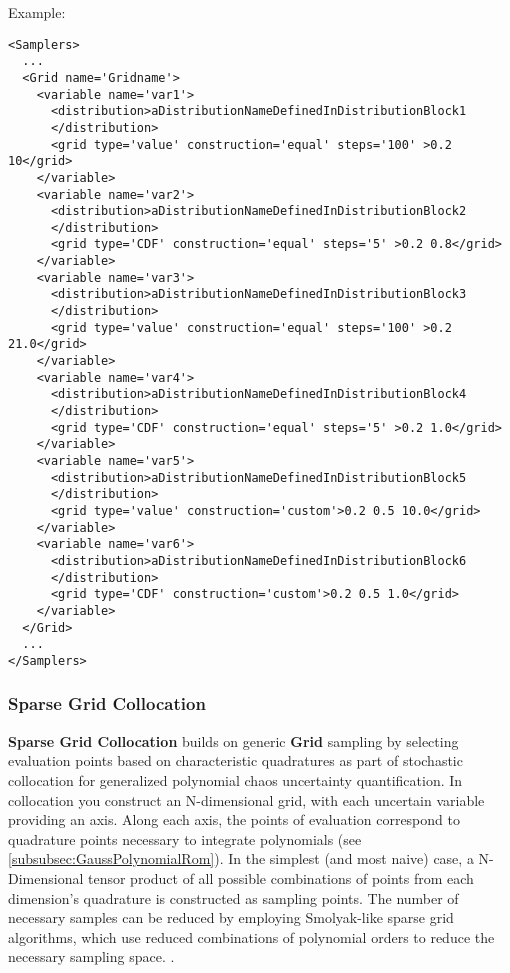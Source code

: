 Example:
\begin{lstlisting}[style=XML,morekeywords={construction,steps,lowerBound,upperBound}]
<Samplers>
  ...
  <Grid name='Gridname'>
    <variable name='var1'>
      <distribution>aDistributionNameDefinedInDistributionBlock1
      </distribution>
      <grid type='value' construction='equal' steps='100' >0.2 10</grid>
    </variable>
    <variable name='var2'>
      <distribution>aDistributionNameDefinedInDistributionBlock2
      </distribution>
      <grid type='CDF' construction='equal' steps='5' >0.2 0.8</grid>
    </variable>
    <variable name='var3'>
      <distribution>aDistributionNameDefinedInDistributionBlock3
      </distribution>
      <grid type='value' construction='equal' steps='100' >0.2 21.0</grid>
    </variable>
    <variable name='var4'>
      <distribution>aDistributionNameDefinedInDistributionBlock4
      </distribution>
      <grid type='CDF' construction='equal' steps='5' >0.2 1.0</grid>
    </variable>
    <variable name='var5'>
      <distribution>aDistributionNameDefinedInDistributionBlock5
      </distribution>
      <grid type='value' construction='custom'>0.2 0.5 10.0</grid>
    </variable>
    <variable name='var6'>
      <distribution>aDistributionNameDefinedInDistributionBlock6
      </distribution>
      <grid type='CDF' construction='custom'>0.2 0.5 1.0</grid>
    </variable>
  </Grid>
  ...
</Samplers>
\end{lstlisting}

\subsubsection{Sparse Grid Collocation}
\label{subsubsubsec:SparseGridCollocation}
\textbf{Sparse Grid Collocation} builds on generic \textbf{Grid} sampling by selecting evaluation points based on characteristic quadratures as part of
stochastic collocation for generalized polynomial chaos uncertainty quantification.  In collocation you construct an N-dimensional grid, with each uncertain
variable providing an axis.  Along each axis, the points of evaluation correspond to quadrature points necessary to integrate polynomials
(see \ref{subsubsec:GaussPolynomialRom}).  In the simplest (and most  naive) case, a N-Dimensional tensor product of all possible combinations of points from
each dimension's quadrature is constructed as sampling points.  The number of necessary samples can be reduced by employing Smolyak-like sparse grid algorithms,
which use reduced combinations of polynomial orders to reduce the necessary sampling space.  .

